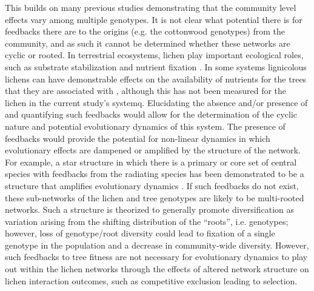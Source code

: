\documentclass[fleqn,12pt]{olplainarticle}
\begin{document}
This builds on many previous studies demonstrating that the community
level effects vary among multiple genotypes. It is not clear what
potential there is for feedbacks there are to the origins (e.g. the
cottonwood genotypes) from the community, and as such it cannot be
determined whether these networks are cyclic or rooted. In terrestrial
ecosystems, lichen play important ecological roles, such as substrate
stabilization \cite{Root2011BioticWashington} and nutrient fixation
\cite{Nelson2018LichenHelens}. In some systems lignicolous lichens can
have demonstrable effects on the availability of nutrients for the
trees that they are associated with \cite{Norby1989NitrogenDioxide},
although this has not been measured for the lichen in the current
study's systemq. Elucidating the absence and/or presence of and
quantifying such feedbacks would allow for the determination of the
cyclic nature and potential evolutionary dynamics of this system. The
presence of feedbacks would provide the potential for non-linear
dynamics in which evolutionary effects are dampened or amplified by
the structure of the network. For example, a star structure in which
there is a primary or core set of central species with feedbacks from
the radiating species has been demonstrated to be a structure that
amplifies evolutionary dynamics
\cite{Lieberman2005EvolutionaryGraphs}. If such feedbacks do not
exist, these sub-networks of the lichen and tree genotypes are
likely to be multi-rooted networks. Such a structure is theorized to
generally promote diversification as variation arising from the
shifting distribution of the ``roots'', i.e. genotypes; however, loss
of genotype/root diversity could lead to fixation of a single genotype
in the population and a decrease in community-wide diversity. However,
such feedbacks to tree fitness are not necessary for evolutionary
dynamics to play out within the lichen networks through the effects of
altered network structure on lichen interaction outcomes, such as
competitive exclusion leading to selection.
\end{document}
